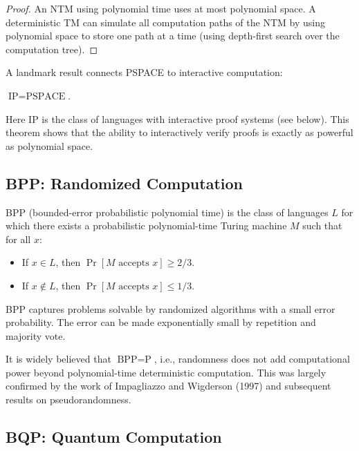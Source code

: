 \begin{proof}
An NTM using polynomial time uses at most polynomial space. A deterministic TM can simulate all computation paths of the NTM by using polynomial space to store one path at a time (using depth-first search over the computation tree).
\end{proof}

A landmark result connects PSPACE to interactive computation:

\begin{theorem}
$\text{IP} = \text{PSPACE}$.
\end{theorem}

Here IP is the class of languages with interactive proof systems (see below). This theorem shows that the ability to interactively verify proofs is exactly as powerful as polynomial space.

\subsection{BPP: Randomized Computation}

\begin{definition}[BPP]
BPP (bounded-error probabilistic polynomial time) is the class of languages $L$ for which there exists a probabilistic polynomial-time Turing machine $M$ such that for all $x$:
\begin{itemize}
  \item If $x \in L$, then $\Pr[M \text{ accepts } x] \geq 2/3$.
  \item If $x \notin L$, then $\Pr[M \text{ accepts } x] \leq 1/3$.
\end{itemize}
\end{definition}

BPP captures problems solvable by randomized algorithms with a small error probability. The error can be made exponentially small by repetition and majority vote.

\begin{conjecture}[BPP = P]
It is widely believed that $\text{BPP} = \text{P}$, i.e., randomness does not add computational power beyond polynomial-time deterministic computation. This was largely confirmed by the work of Impagliazzo and Wigderson (1997) and subsequent results on pseudorandomness.
\end{conjecture}

\subsection{BQP: Quantum Computation}

